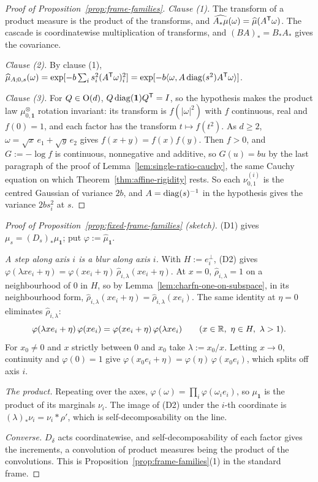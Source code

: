 \begin{proof}[Proof of Proposition~\ref{prop:frame-families}]
\emph{Clause (1).} The transform of a product measure is the product of the transforms, and
$\widehat{A_*\mu}(\omega) = \widehat\mu(A^{\mathsf{T}}\omega)$. The cascade is coordinatewise multiplication
of transforms, and $(BA)_* = B_*A_*$ gives the covariance.

\emph{Clause (2).} By clause (1),
$\widehat\mu_{A;0,s}(\omega) = \exp[-b\sum_is_i^2(A^{\mathsf{T}}\omega)_i^2] =
\exp[-b\langle\omega, A\operatorname{diag}(s^2)A^{\mathsf{T}}\omega\rangle]$.

\emph{Clause (3).} For $Q \in \mathrm{O}(d)$, $Q\operatorname{diag}(\mathbf 1)Q^{\mathsf{T}} = I$, so the hypothesis makes the
product law $\mu^\otimes_{0,\mathbf 1}$ rotation invariant: its transform is $f(|\omega|^2)$ with $f$
continuous, real and $f(0) = 1$, and each factor has the transform $t \mapsto f(t^2)$. As $d \ge 2$,
$\omega = \sqrt x\,e_1 + \sqrt y\,e_2$ gives $f(x+y) = f(x)f(y)$. Then $f > 0$, and $G := -\log f$ is
continuous, nonnegative and additive, so $G(u) = bu$ by the last paragraph of the proof of
Lemma~\ref{lem:single-ratio-cauchy}, the same Cauchy equation on which
Theorem~\ref{thm:affine-rigidity} rests. So each $\nu^{(i)}_{0,1}$ is the centred Gaussian of variance
$2b$, and $A = \operatorname{diag}(s)^{-1}$ in the hypothesis gives the variance $2bs_i^2$ at $s$.
\end{proof}

\begin{proof}[Proof of Proposition~\ref{prop:fixed-frame-families} (sketch)]
(D1) gives
$\mu_s = (D_s)_*\mu_{\mathbf 1}$; put $\varphi := \widehat\mu_{\mathbf 1}$.

\emph{A step along axis $i$ is a blur along axis $i$.} With $H := e_i^\perp$, (D2) gives
$\varphi(\lambda xe_i + \eta) = \varphi(xe_i + \eta)\,\widehat\rho_{i,\lambda}(xe_i + \eta)$. At $x = 0$,
$\widehat\rho_{i,\lambda} = 1$ on a neighbourhood of $0$ in $H$, so by
Lemma~\ref{lem:charfn-one-on-subspace}, in its neighbourhood form, $\widehat\rho_{i,\lambda}(xe_i + \eta)
= \widehat\rho_{i,\lambda}(xe_i)$. The same identity at $\eta = 0$ eliminates
$\widehat\rho_{i,\lambda}$:
\[
  \varphi(\lambda xe_i + \eta)\,\varphi(xe_i) = \varphi(xe_i + \eta)\,\varphi(\lambda xe_i)
  \qquad (x \in \mathbb{R},\ \eta \in H,\ \lambda > 1).
\]
For $x_0 \ne 0$ and $x$ strictly between $0$ and $x_0$ take $\lambda := x_0/x$. Letting $x \to 0$,
continuity and $\varphi(0) = 1$ give $\varphi(x_0e_i + \eta) = \varphi(\eta)\,\varphi(x_0e_i)$, which splits
off axis $i$.

\emph{The product.} Repeating over the axes, $\varphi(\omega) = \prod_i\varphi(\omega_ie_i)$, so
$\mu_{\mathbf 1}$ is the product of its marginals $\nu_i$. The image of (D2) under the $i$-th coordinate
is $(\lambda)_*\nu_i = \nu_i * \rho'$, which is self-decomposability on the line.

\emph{Converse.} $D_\delta$ acts coordinatewise, and self-decomposability of each factor gives the
increments, a convolution of product measures being the product of the convolutions. This is
Proposition~\ref{prop:frame-families}(1) in the standard frame.
\end{proof}

